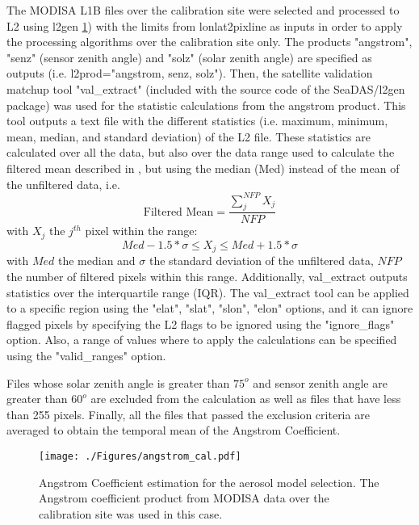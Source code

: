 \documentclass[]{interact}
\theoremstyle{plain}%
\theoremstyle{definition}
\theoremstyle{remark}
\begin{document}
The MODISA L1B files over the calibration site were selected and processed to L2 using l2gen \ref{fig:angstrom_cal}) with the limits from lonlat2pixline as inputs in order to apply the processing algorithms over the calibration site only. The products "angstrom", "senz" (sensor zenith angle) and "solz" (solar zenith angle) are specified as outputs (i.e. l2prod="angstrom, senz, solz"). Then, the satellite validation matchup tool "val\_extract" (included with the source code of the SeaDAS/l2gen package) was used for the statistic calculations from the angstrom product. This tool outputs a text file with the different statistics (i.e. maximum, minimum, mean, median, and standard deviation) of the L2 file. These statistics are calculated over all the data, but also over the data range used to calculate the filtered mean described in \citep{Bailey2006}, but using the median (Med) instead of the mean of the unfiltered data, i.e.
\begin{equation}
  \text{Filtered Mean}=\frac{\displaystyle \sum_j^{NFP}X_j}{NFP}
\end{equation}
with $X_j$ the $j^{th}$ pixel within the range:
\begin{equation}
  Med-1.5*\sigma\leq X_j\leq Med+1.5*\sigma
\end{equation}
with $Med$ the median and $\sigma$ the standard deviation of the unfiltered data, $NFP$ the number of filtered pixels within this range. Additionally, val\_extract outputs statistics over the interquartile range (IQR). The val\_extract tool can be applied to a specific region using the "elat", "slat", "slon", "elon" options, and it can ignore flagged pixels by specifying the L2 flags to be ignored using the "ignore\_flags" option. Also, a range of values where to apply the calculations can be specified using the "valid\_ranges" option. 

Files whose solar zenith angle is greater than $75^o$ and sensor zenith angle are greater than $60^o$ are excluded from the calculation as well as files that have less than 255 pixels. Finally, all the files that passed the exclusion criteria are averaged to obtain the temporal mean of the Angstrom Coefficient. 
\begin{figure}[H]
  \centering
  \texttt{[image: ./Figures/angstrom\_cal.pdf]}
    \caption{Angstrom Coefficient estimation for the aerosol model selection. The Angstrom coefficient product from MODISA data over the calibration site was used in this case.  \label{fig:angstrom_cal}} 
\end{figure}
\end{document}
